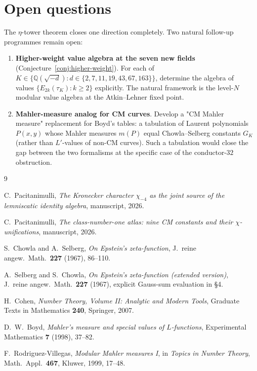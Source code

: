 \documentclass[11pt]{amsart}
\theoremstyle{plain}
\theoremstyle{definition}
\theoremstyle{remark}
\newcommand{\GK}{G_{K}}
\newcommand{\Q}{\mathbb{Q}}
\begin{document}
\section{Open questions}\label{sec:open}

The $\eta$-tower theorem closes one direction completely. Two natural
follow-up programmes remain open:

\begin{enumerate}[label=\textbf{E\arabic*.}, leftmargin=*, itemsep=4pt]

\item \textbf{Higher-weight value algebra at the seven new fields}
(Conjecture~\ref{conj:higher-weight}). For each of $K \in \{\Q(\sqrt{-d}) : d \in \{2,7,11,19,43,67,163\}\}$,
determine the algebra of values $\{E_{2k}(\tau_K) : k \geq 2\}$ explicitly.
The natural framework is the level-$N$ modular value algebra at the
Atkin--Lehner fixed point.

\item \textbf{Mahler-measure analog for CM curves}. Develop a "CM Mahler
measure" replacement for Boyd's tables: a tabulation of Laurent
polynomials $P(x, y)$ whose Mahler measures $m(P)$ equal Chowla--Selberg
constants $\GK$ (rather than $L'$-values of non-CM curves). Such a
tabulation would close the gap between the two formalisms at the
specific case of the conductor-$32$ obstruction.

\end{enumerate}

\begin{thebibliography}{9}

C.\ Pacitanimulli,
\textit{The Kronecker character $\chi_{-4}$ as the joint source of the
lemniscatic identity algebra},
manuscript, 2026.

C.\ Pacitanimulli,
\textit{The class-number-one atlas: nine CM constants and their $\chi$-unifications},
manuscript, 2026.

S.\ Chowla and A.\ Selberg,
\textit{On Epstein's zeta-function},
J.\ reine angew.\ Math.\ \textbf{227} (1967), 86--110.

A.\ Selberg and S.\ Chowla,
\textit{On Epstein's zeta-function (extended version)},
J.\ reine angew.\ Math.\ \textbf{227} (1967), explicit Gauss-sum evaluation in \S 4.

H.\ Cohen,
\emph{Number Theory, Volume II: Analytic and Modern Tools},
Graduate Texts in Mathematics \textbf{240}, Springer, 2007.

D.\ W.\ Boyd,
\textit{Mahler's measure and special values of $L$-functions},
Experimental Mathematics \textbf{7} (1998), 37--82.

F.\ Rodriguez-Villegas,
\textit{Modular Mahler measures I},
in \emph{Topics in Number Theory}, Math.\ Appl.\ \textbf{467}, Kluwer, 1999, 17--48.

\end{thebibliography}
\end{document}
